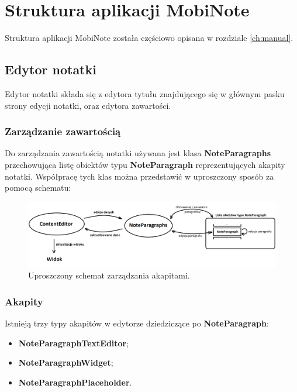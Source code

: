 \chapter{Struktura aplikacji MobiNote}

Struktura aplikacji MobiNote została częściowo opisana w rozdziale \ref{ch:manual}.

\section{Edytor notatki}

Edytor notatki składa się z edytora tytułu znajdującego się w głównym pasku strony edycji notatki, oraz edytora zawartości.

\subsection{Zarządzanie zawartością}

Do zarządzania zawartością notatki używana jest klasa \textbf{NoteParagraphs} przechowująca listę obiektów typu \textbf{NoteParagraph} reprezentujących akapity notatki.
Współpracę tych klas można przedstawić w uproszczony sposób za pomocą schematu:

\begin{figure}[ht]
    \centering
    \includegraphics[width=\linewidth]{images/ContentEditor_podzial.png}
    \caption{Uproszczony schemat zarządzania akapitami.}
\end{figure}

\newpage

\subsection{Akapity}

Istnieją trzy typy akapitów w edytorze dziedziczące po \textbf{NoteParagraph}: 
\begin{itemize}
    \item \textbf{NoteParagraphTextEditor};
    \item \textbf{NoteParagraphWidget};
    \item \textbf{NoteParagraphPlaceholder}.
\end{itemize}

